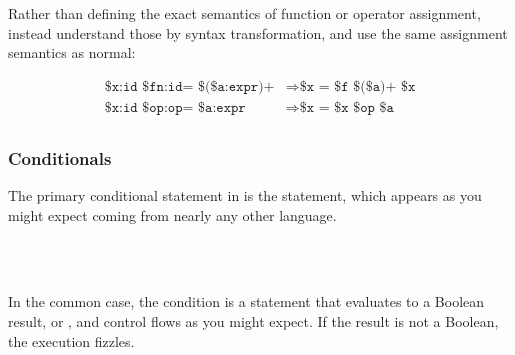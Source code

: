 \begin{prooftree}
\end{prooftree}

Rather than defining the exact semantics of function or operator assignment,
instead understand those by syntax transformation, and use the same assignment
semantics as normal:

\begin{align*}
    \texttt{\$x:id \$fn:id= \$(\$a:expr)+} &\Rightarrow \texttt{\$x = \$f \$(\$a)+ \$x} \\ %
    \texttt{\$x:id \$op:op= \$a:expr} & \Rightarrow \texttt{\$x = \$x \$op \$a} \\ %
\end{align*}

\subsubsection{Conditionals}

The primary conditional statement in \Prose{} is the  statement,
which appears as you might expect coming from nearly any other language.

\begin{bnf*}
     \\
     \\
\end{bnf*}

In the common case, the condition is a statement that evaluates to a Boolean
result,  or , and control flows as you might expect.
If the result is not a Boolean, the execution fizzles.

